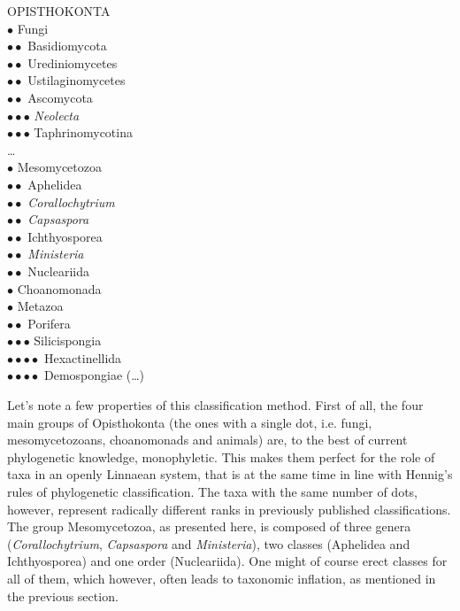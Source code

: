 \begin{artengenv}
\noindent OPISTHOKONTA\\
$\bullet$ Fungi\\
$\bullet\bullet$ Basidiomycota\\
$\bullet\bullet$ Urediniomycetes\\
$\bullet\bullet$ Ustilaginomycetes\\
$\bullet\bullet$ Ascomycota\\
$\bullet\bullet$$\bullet$ \textit{Neolecta}\\
$\bullet\bullet$$\bullet$ Taphrinomycotina\\
\ldots\\
$\bullet$ Mesomycetozoa\\
$\bullet\bullet$ Aphelidea\\
$\bullet\bullet$ \textit{Corallochytrium}\\
$\bullet\bullet$ \textit{Capsaspora}\\
$\bullet\bullet$ Ichthyosporea\\
$\bullet\bullet$ \textit{Ministeria}\\
$\bullet\bullet$ Nucleariida\\
$\bullet$ Choanomonada\\
$\bullet$ Metazoa\\
$\bullet\bullet$ Porifera\\
$\bullet\bullet$$\bullet$ Silicispongia\\
$\bullet\bullet$$\bullet\bullet$ Hexactinellida\\
$\bullet\bullet$$\bullet\bullet$ Demospongiae (\ldots)

Let’s note a few properties of this classification method. First of all, the four main groups of Opisthokonta
(the ones with a single dot, i.e. fungi, mesomycetozoans, choanomonads and animals) are, to the best of current
phylogenetic knowledge, monophyletic. This makes them perfect for the role of taxa in an openly Linnaean system, that
is at the same time in line with Hennig’s rules of phylogenetic classification. The taxa with the same number of dots,
however, represent radically different ranks in previously published classifications. The group Mesomycetozoa, as
presented here, is composed of three genera (\textit{Corallochytrium}, \textit{Capsaspora} and \textit{Ministeria}),
two classes (Aphelidea and Ichthyosporea) and one order (Nucleariida). One might of course erect classes for all of
them, which however, often leads to taxonomic inflation, as mentioned in the previous section.


\end{artengenv}
